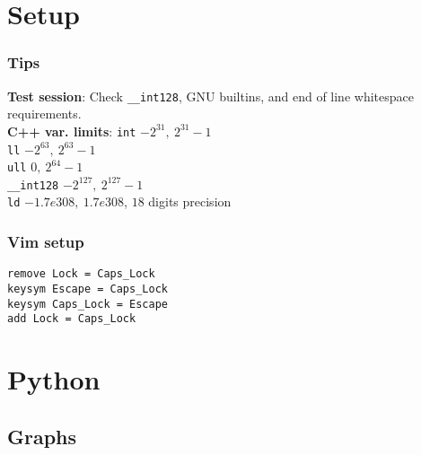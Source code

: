 \documentclass[
	a4paper,
	landscape,
	10pt,
]{article}
\begin{document}
\setcounter{tocdepth}{3}
\tableofcontents

\begin{multicols}{3}
\section{Setup}
\subsubsection{Tips}
\textbf{Test session}: Check \texttt{\_\_int128}, GNU builtins, and end of line whitespace requirements. \\
\textbf{C++ var. limits}: 
\texttt{int} $-2^{31},~2^{31}-1$ \\
\texttt{ll} $-2^{63},~2^{63}-1$ \\
\texttt{ull} $0,~2^{64}-1$ \\
\texttt{\_\_int128} $-2^{127},~2^{127}-1$\\
\texttt{ld} $-1.7e308,~1.7e308$, $18$ digits precision
\subsubsection{Vim setup}
\texttt{remove Lock = Caps\_Lock} \\
\texttt{keysym Escape = Caps\_Lock} \\
\texttt{keysym Caps\_Lock = Escape} \\
\texttt{add Lock = Caps\_Lock} \\


\section{Python}
\subsection{Graphs}
	

\end{multicols}
\end{document}

